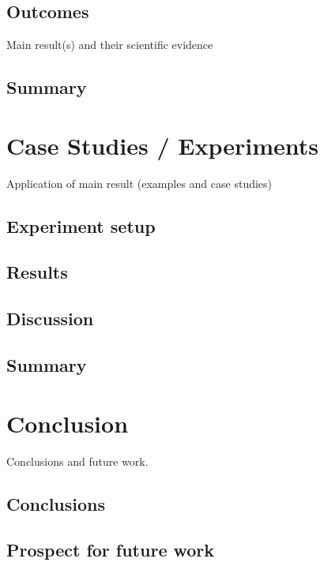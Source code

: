 \documentclass[
  oneside,
  11pt, a4paper,
  footinclude=true,
  headinclude=true,
  cleardoublepage=empty
]{scrbook}
\begin{document}
    \section{Outcomes}
      Main result(s) and their scientific evidence

    \section{Summary}

  \chapter{Case Studies / Experiments}
    Application of main result (examples and case studies)

    \section{Experiment setup}

    \section{Results}

    \section{Discussion}

    \section{Summary}

  \chapter{Conclusion}
    Conclusions and future work.

    \section{Conclusions}

    \section{Prospect for future work}
\end{document}
